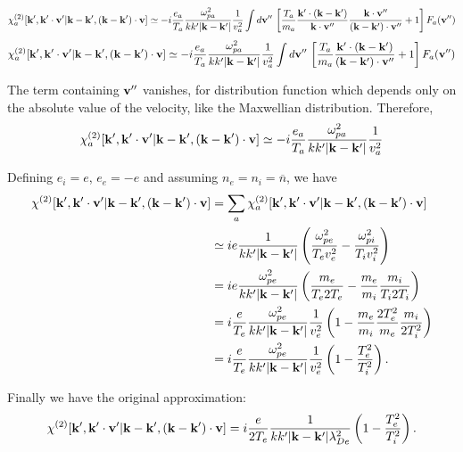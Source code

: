 \documentclass[12pt,a4paper,ruledheader]{report}
\begin{document}
\begin{appendix}
\begin{equation}
\chi_a^{(2)}[{\bf k'},{\bf k'\cdot v'}|{\bf k-k'},({\bf k-k'})\cdot{\bf v}]
\simeq-i\frac{e_a}{T_a}\frac{\omega_{pa}^2}{k k'|{\bf k-k'}|}\frac{1}{v_{a}^2}
\int d{\bf v''}\,\left[\frac{T_a}{m_a}
\frac{{\bf k'}\cdot({\bf k-k'})}{{\bf k}\cdot{\bf v''}}
\frac{{\bf k}\cdot {\bf v''}}{({\bf k-k'})\cdot{\bf v''}}+1
\right] F_a({\bf v''}) 
\end{equation}
\begin{equation}
\chi_a^{(2)}[{\bf k'},{\bf k'\cdot v'}|{\bf k-k'},({\bf k-k'})\cdot{\bf v}]
\simeq-i\frac{e_a}{T_a}\frac{\omega_{pa}^2}{k k'|{\bf k-k'}|}\frac{1}{v_{a}^2}
\int d{\bf v''}\,\left[\frac{T_a}{m_a}
\frac{{\bf k'}\cdot({\bf k-k'})}{({\bf k-k'})\cdot{\bf v''}}+1
\right] F_a({\bf v''}) 
\end{equation}

The term containing ${\bf v''}$ vanishes, for distribution function which
depends only on the absolute value of the velocity, like the Maxwellian 
distribution. Therefore,
\begin{equation}
\chi_a^{(2)}[{\bf k'},{\bf k'\cdot v'}|{\bf k-k'},({\bf k-k'})\cdot{\bf v}]
\simeq-i\frac{e_a}{T_a}\frac{\omega_{pa}^2}{k k'|{\bf k-k'}|}\frac{1}{v_{a}^2}
\end{equation}

Defining $e_i=e$, $e_e=-e$ and assuming $n_e=n_i=\overline{n}$, we have
\begin{equation}
\begin{split}
\label{chi2,5}
\chi^{(2)}[{\bf k'},{\bf k'\cdot v'}|{\bf k-k'},({\bf k-k'})\cdot{\bf v}]
&= \sum_a\chi_a^{(2)}[{\bf k'},{\bf k'\cdot v'}|{\bf k-k'},({\bf k-k'})\cdot{\bf v}]\\
&\simeq  i e\frac{1}{k k'|{\bf k-k'}|}
\left(\frac{\omega_{pe}^2}{T_e v_{e}^2}-\frac{\omega_{pi}^2}{T_i v_{i}^2}\right)\\
&=i e\frac{\omega_{pe}^2}{k k'|{\bf k-k'}|}
\left(\frac{m_e}{T_e 2T_e}-\frac{m_e}{m_i}\frac{m_i}{T_i 2 T_i}\right)\\
&=i\frac{e}{T_e}\frac{\omega_{pe}^2}{k k'|{\bf k-k'}|}\frac{1}{v_{e}^2}
\left(1-\frac{m_e}{m_i}\frac{2T_e^2}{m_e}\frac{m_i}{2T_i^2}\right)\\
&=i\frac{e}{T_e}\frac{\omega_{pe}^2}{k k'|{\bf k-k'}|}\frac{1}{v_{e}^2}
\left(1-\frac{T_e^2}{T_i^2}\right).
\end{split}
\end{equation}

Finally we have the original approximation:
\begin{equation}
\chi^{(2)}[{\bf k'},{\bf k'\cdot v'}|{\bf k-k'},({\bf k-k'})\cdot{\bf v}]
=i\frac{e}{2T_e}\frac{1}{k k'|{\bf k-k'}|\lambda_{De}^2}
\left(1-\frac{T_e^2}{T_i^2}\right).
\end{equation}


\end{appendix}
\end{document}
